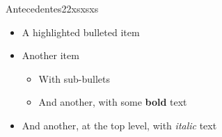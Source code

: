 \begin{frame}{\color{blue}Antecedentes22xsxsxs}

  
  \begin{itemize}
    \item A \alert{highlighted} bulleted item
      \pause
    \item Another item
      \begin{itemize}
        \item With sub-bullets
        \item And another, with some \textbf{bold} text
      \end{itemize}
    \item And another, at the top level, with \textit{italic} text
  \end{itemize}
  
\end{frame}
